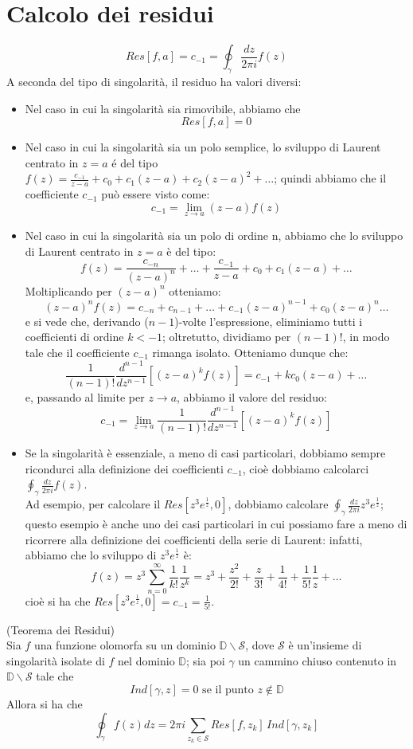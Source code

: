 \section{Calcolo dei residui}
$$Res[f,a]=c_{-1}=\oint_{\gamma} \frac{dz}{2 \pi i} f(z)$$
A seconda del tipo di singolarità, il residuo ha valori diversi:
\begin{itemize}
\item Nel caso in cui la singolarità sia rimovibile, abbiamo che
$$Res[f,a]=0$$
\item Nel caso in cui la singolarità sia un polo semplice, lo sviluppo di Laurent centrato in $z=a$ é del tipo $f(z)=\frac{c_{-1}}{z-a}+c_0+c_1(z-a)+c_2(z-a)^2+ \dots$; quindi abbiamo che il coefficiente $c_{-1}$ può essere visto come:
$$c_{-1}=\lim_{z\to a} (z-a) f(z)$$
\item Nel caso in cui la singolarità sia un polo di ordine n, abbiamo che lo sviluppo di Laurent centrato in $z=a$ è del tipo:
$$f(z)=\frac{c_{-n}}{(z-a)^n}+ \dots + \frac{c_{-1}}{z-a}+c_0+c_1(z-a)+ \dots$$
Moltiplicando per $(z-a)^n$ otteniamo:
$$(z-a)^nf(z)=c_{-n}+ c_{n-1}+ \dots + c_{-1}(z-a)^{n-1}+c_0 (z-a)^n\dots$$
e si vede che, derivando ($n-1$)-volte l'espressione, eliminiamo tutti i coefficienti di ordine $k<-1$; oltretutto, dividiamo per $(n-1)!$, in modo tale che il coefficiente $c_{-1}$ rimanga isolato. Otteniamo dunque che:
$$\frac{1}{(n-1)!} \frac{d^{n-1}}{dz^{n-1}} [(z-a)^k f(z)]=c_{-1}+k c_0(z-a)+ \dots$$
e, passando al limite per $z \to a$, abbiamo il valore del residuo:
$$c_{-1}= \lim_{z \to a} \frac{1}{(n-1)!} \frac{d^{n-1}}{dz^{n-1}} [(z-a)^k f(z)]$$
\item Se la singolarità è essenziale, a meno di casi particolari, dobbiamo sempre ricondurci alla definizione dei coefficienti $c_{-1}$, cioè dobbiamo calcolarci $\oint_{\gamma} \frac{dz}{2 \pi i} f(z)$. \\Ad esempio, per calcolare il $Res[z^3 e^{\frac{1}{z}},0]$, dobbiamo calcolare $\oint_{\gamma} \frac{dz}{2 \pi i} z^3 e^{\frac{1}{z}}$; questo esempio è anche uno dei casi particolari in cui possiamo fare a meno di ricorrere alla definizione dei coefficienti della serie di Laurent: infatti, abbiamo che lo sviluppo di $z^3 e^{\frac{1}{z}}$ è:
$$f(z)=z^3 \sum_{n=0} ^{\infty} \frac{1}{k!} \frac{1}{z^k}=z^3+\frac{z^2}{2!}+\frac{z}{3!} +\frac{1}{4!} +\frac{1}{5!} \frac{1}{z} +\dots$$
cioè si ha che $Res[z^3 e^{\frac{1}{z}},0]=c_{-1}=\frac{1}{5!}$.
\end{itemize}
\begin{teorema} (Teorema dei Residui) \\
Sia $f$ una funzione olomorfa su un dominio $\mathbb{D} \backslash \mathcal{S}$, dove $\mathcal{S}$ è un'insieme di singolarità isolate di $f$ nel dominio $\mathbb{D}$; sia poi $\gamma$ un cammino chiuso contenuto in $\mathbb{D} \backslash \mathcal{S}$ tale che
$$Ind[\gamma,z]=0 \text{ se il punto } z \notin \mathbb{D}$$
Allora si ha che
$$\oint_{\gamma} f(z) dz = 2 \pi i \sum_{z_k \in \mathcal{S}} Res[f,z_k]\, Ind[\gamma,z_k]$$
\end{teorema}
